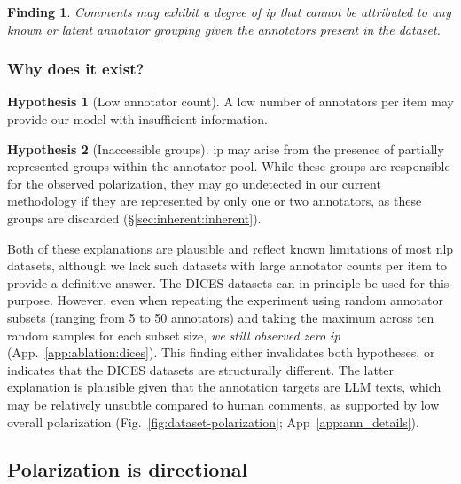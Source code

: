 \documentclass{article} %
\theoremstyle{definition}
\newtheorem{hypothesis}{Hypothesis}
\theoremstyle{plain}
\newtheorem{finding}{Finding}
\begin{document}
\begin{finding}
	\label{finding:inherent}
	Comments may exhibit a degree of \ac{ip} that cannot be attributed to any known or latent annotator grouping given the annotators present in the dataset.
\end{finding}


\subsubsection{Why does it exist?}
\label{sec:inherent:why}

\begin{hypothesis}[Low annotator count]
	\label{hyp:few-annotators}
	A low number of annotators per item may provide our model with insufficient information.
\end{hypothesis}

\begin{hypothesis}[Inaccessible groups]
	\label{hyp:groups}
	\ac{ip} may arise from the presence of partially represented groups within the annotator pool. While these groups are responsible for the observed polarization, they may go undetected in our current methodology if they are represented by only one or two annotators, as these groups are discarded (\S\ref{sec:inherent:inherent}). 
\end{hypothesis}

Both of these explanations are plausible and reflect known limitations of most \ac{nlp} datasets, although we lack such datasets with large annotator counts per item to provide a definitive answer. The DICES datasets can in principle be used for this purpose. However, even when repeating the experiment using random annotator subsets (ranging from 5 to 50 annotators) and taking the maximum across ten random samples for each subset size, \emph{we still observed zero \ac{ip}} (App.~\ref{app:ablation:dices}). This finding either invalidates both hypotheses, or indicates that the DICES datasets are structurally different. The latter explanation is plausible given that the annotation targets are LLM texts, which may be relatively unsubtle compared to human comments, as supported by low overall polarization (Fig.~\ref{fig:dataset-polarization}; App~\ref{app:ann_details}).


\subsection{Polarization is directional}
\label{sec:apunim:conflicting}
\end{document}
